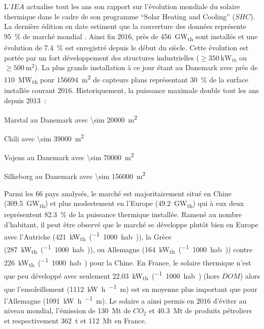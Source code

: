 L’$IEA$ actualise tout les ans son rapport sur l’évolution mondiale du solaire thermique
dans le cadre de son programme \enquote{Solar Heating and Cooling} ($SHC$). La dernière
édition en date estiment que la couverture des données représente \SI{95}{\percent} de
marché mondial \parencite{Weiss2017}. Ainsi fin 2016, près de \SI{456}{\giga\watt_{th}}
sont installés et une évolution de \SI{7.4}{\percent} est enregistré depuis le début du
siècle. Cette évolution est portée par un fort développement des structures industrielles
($\geq \SI{350}{\kilo\watt_{th}}$ ou $\geq \SI{500}{\metre\squared}$). La plus grande
installation à ce jour étant au Danemark avec près de \SI{110}{\mega\watt_{th}} pour
\SI{156694}{\metre\squared} de capteurs plans représentant \SI{30}{\percent} de la surface
installée courant $2016$. Historiquement, la puissance maximale double tout les ans depuis
2013~:
\begin{description}[align=left]
    \item [2013] Marstal au Danemark avec \SI{\sim 20000}{\metre\squared}
    \item [2014] Chili avec \SI{\sim 39000}{\metre\squared}
    \item [2015] Vojens au Danemark avec \SI{\sim 70000}{\metre\squared}
    \item [2016] Silkeborg  au Danemark avec \SI{\sim 156000}{\metre\squared}
\end{description}
Parmi les $66$ pays analysés, le marché est majoritairement situé en Chine
(\SI{309.5}{\giga\watt_{th}}) et plus modestement en l’Europe (\SI{49.2}{\giga\watt_{th}})
qui à eux deux représentent \SI{82.3}{\percent} de la puissance thermique installée.
Ramené au nombre d’habitant, il peut être observé que le marché se développe plutôt bien
en Europe avec l’Autriche (\SI{421}{\kilo\watt_{th}\per(1000 hab.)}), la Grèce
(\SI{287}{\kilo\watt_{th}\per(1000 hab.)}), ou Allemagne
(\SI{164}{\kilo\watt_{th}\per(1000 hab.)}) contre \SI{226}{\kilo\watt_{th}\per(1000 hab.)}
pour la Chine. En France, le solaire thermique n’est que peu développé avec seulement
\SI{22.03}{\kilo\watt_{th}\per(1000 hab.)} (hors $DOM$) alors que l’ensoleillement
(\SI{1112}{\kilo\watt\hour\per\squared\metre}) est en moyenne plus important que
pour l’Allemagne (\SI{1091}{\kilo\watt\hour\per\squared\metre}).
Le solaire a ainsi permis en $2016$ d’éviter au niveau mondial, l’émission de
\SI{130}{\mega\tonne} de $CO_{2}$ et \SI{40.3}{\mega\tonne} de produits pétroliers et
respectivement \SI{362}{\tonne} et \SI{112}{\mega\tonne} en France.

